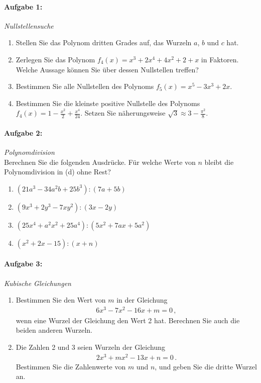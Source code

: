
\paragraph{Aufgabe 1: } \emph{Nullstellensuche}
\begin{enumerate}[label=(\alph*), labelindent=1em,labelsep=0.5cm]
    \item Stellen Sie das Polynom dritten Grades auf, das Wurzeln $a$, $b$ und $c$ hat.
    \item Zerlegen Sie das Polynom $f_4(x)=x^3+2x^4+4x^2+2+x$ in Faktoren. Welche Aussage können Sie über dessen Nullstellen treffen?
    \item Bestimmen Sie alle Nullstellen des Polynoms $f_5(x)=x^5-3x^3+2x$.
    \item Bestimmen Sie die kleinste positive Nullstelle des Polynoms $\displaystyle f_4(x)=1-\frac{x^2}{2}+\frac{x^4}{24}$. Setzen Sie näherungsweise $\displaystyle \sqrt{3}\approx 3-\frac{\pi^2}{8}$.
\end{enumerate}

\paragraph{Aufgabe 2: } \emph{Polynomdivision}\\[0.2cm]
Berechnen Sie die folgenden Ausdrücke. Für welche Werte von $n$ bleibt die Polynomdivision in (d) ohne Rest?
\begin{multicols}{2}
    \begin{enumerate}[label=(\alph*), labelindent=1em,labelsep=0.5cm]
        \item $(21a^3-34a^2b+25b^3):(7a+5b)$
        \item $(9x^3+2y^3-7xy^2):(3x-2y)$
        \item $(25x^4+a^2x^2+25a^4):(5x^2+7ax+5a^2)$
        \item $(x^2+2x-15):(x+n)$
    \end{enumerate}
\end{multicols}

\paragraph{Aufgabe 3: } \emph{Kubische Gleichungen}
\begin{enumerate}[label=(\alph*)]
    \item Bestimmen Sie den Wert von $m$ in der Gleichung
    \begin{align*}
    6x^3-7x^2-16x+m=0\,,
    \end{align*}
    wenn eine Wurzel der Gleichung den Wert 2 hat. Berechnen Sie auch die beiden anderen Wurzeln.
    \item Die Zahlen 2 und 3 seien Wurzeln der Gleichung
    \begin{align*}
    2x^3+mx^2-13x+n=0\,.
    \end{align*}
    Bestimmen Sie die Zahlenwerte von $m$ und $n$, und geben Sie die dritte Wurzel an.
\end{enumerate}

